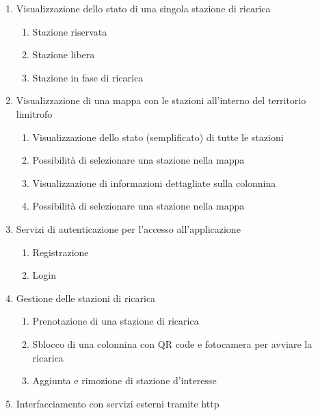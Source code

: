 \begin{enumerate}[label=\arabic*.]
    \item Visualizzazione dello stato di una singola stazione di ricarica
          \begin{enumerate}[label=\arabic{enumi}.\arabic*]
              \item Stazione riservata
              \item Stazione libera
              \item Stazione in fase di ricarica
          \end{enumerate}
    \item Visualizzazione di una mappa con le stazioni all'interno del territorio limitrofo
          \begin{enumerate}[label=\arabic{enumi}.\arabic*]
              \item Visualizzazione dello stato (semplificato) di tutte le stazioni
              \item Possibilità di selezionare una stazione nella mappa
              \item Visualizzazione di informazioni dettagliate sulla colonnina
              \item Possibilità di selezionare una stazione nella mappa
          \end{enumerate}
    \item Servizi di autenticazione per l'accesso all'applicazione
          \begin{enumerate}[label=\arabic{enumi}.\arabic*]
              \item Registrazione
              \item Login
          \end{enumerate}
    \item Gestione delle stazioni di ricarica
          \begin{enumerate}[label=\arabic{enumi}.\arabic*]
              \item Prenotazione di una stazione di ricarica
              \item Sblocco di una colonnina con QR code e fotocamera per avviare la ricarica
              \item Aggiunta e rimozione di stazione d'interesse
          \end{enumerate}
    \item Interfacciamento con servizi esterni tramite http
\end{enumerate}

